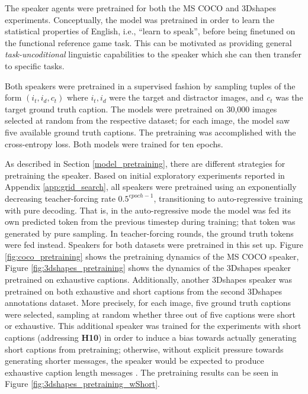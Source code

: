 The speaker agents were pretrained for both the MS COCO and 3Dshapes experiments. Conceptually, the model was pretrained in order to learn the statistical properties of English, i.e., ``learn to speak'', before being finetuned on the functional reference game task. This can be motivated as providing general \textit{task-uncoditional} linguistic capabilities to the speaker which she can then transfer to specific tasks.

Both speakers were pretrained in a supervised fashion by sampling tuples of the form $(i_t, i_d, c_t)$ where $i_t, i_d$ were the target and distractor images, and $c_t$ was the target ground truth caption. The models were pretrained on 30,000 images selected at random from the respective dataset; for each image, the model saw five available ground truth captions. 
The pretraining was accomplished with the cross-entropy loss. Both models were trained for ten epochs.

As described in Section \ref{model_pretraining}, there are different strategies for pretraining the speaker. Based on initial exploratory experiments reported in Appendix \ref{app:grid_search}, all speakers were pretrained using an exponentially decreasing teacher-forcing rate $0.5^{epoch-1}$, transitioning to auto-regressive training with pure decoding. That is, in the auto-regressive mode the model was fed its own predicted token from the previous timestep during training; that token was generated by pure sampling. In teacher-forcing rounds, the ground truth tokens were fed instead.
Speakers for both datasets were pretrained in this set up. Figure \ref{fig:coco_pretraining} shows the pretraining dynamics of the MS COCO speaker, Figure \ref{fig:3dshapes_pretraining} shows the dynamics of the 3Dshapes speaker pretrained on exhaustive captions. Additionally, another 3Dshapes speaker was pretrained on both exhaustive and short captions from the second 3Dshapes annotations dataset. More precisely, for each image, five ground truth captions were selected, sampling at random whether three out of five captions were short or exhaustive. This additional speaker was trained for the experiments with short captions (addressing \textbf{H10}) in order to induce a bias towards actually generating short captions from pretraining; otherwise, without explicit pressure towards generating shorter messages, the speaker would be expected to produce exhaustive caption length messages \parencite[cf., e.~g.,][]{hupkes2020compositionality}. The pretraining results can be seen in Figure \ref{fig:3dshapes_pretraining_wShort}.

